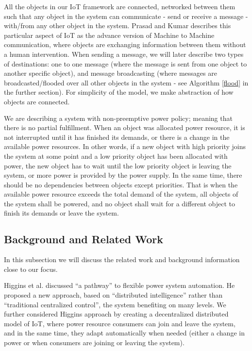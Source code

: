 \documentclass[../main/IoT.tex]{subfiles}
\begin{document}
All the objects in our IoT framework are connected, networked between them such that any object in the system can communicate - send or receive a message - with/from any other object in the system. Prasad and Kumar \cite{prasad2012energy} describes this particular aspect of IoT as the advance version of Machine to Machine communication, where objects are exchanging information between them without a human intervention. When sending a message, we will later describe two types of destinations: one to one message (where the message is sent from one object to another specific object), and message broadcasting (where messages are broadcasted/flooded over all other objects in the system - see Algorithm \ref{flood} in the further section). For simplicity of the model, we make abstraction of how objects are connected.

We are describing a system with non-preemptive power policy; meaning that there is no partial fulfillment. When an object was allocated power resource, it is not interrupted until it has finished its demands, or there is a change in the available power resources. In other words, if a new object with high priority joins the system at some point and a low priority object has been allocated with power, the new object has to wait until the low priority object is leaving the system, or more power is provided by the power supply. In the same time, there should be no dependencies between objects except priorities. That is when the available power resource exceeds the total demand of the system, all objects of the system shall be powered, and no object shall wait for a different object to finish its demands or leave the system.

\subsection{Background and Related Work}

In this subsection we will discuss the related work and background information close to our focus.

Higgins et al. \cite{higgins2011distributed} discussed ``a pathway'' to flexible power system automation. He proposed a new approach, based on ``distributed intelligence'' rather than ``traditional centralized control'', the system benefiting on many levels. We further considered Higgins approach by creating a decentralized distributed model of IoT, where power resource consumers can join and leave the system, and in the same time, they adapt automatically when needed (either a change in power or when consumers are joining or leaving the system).
\end{document}
